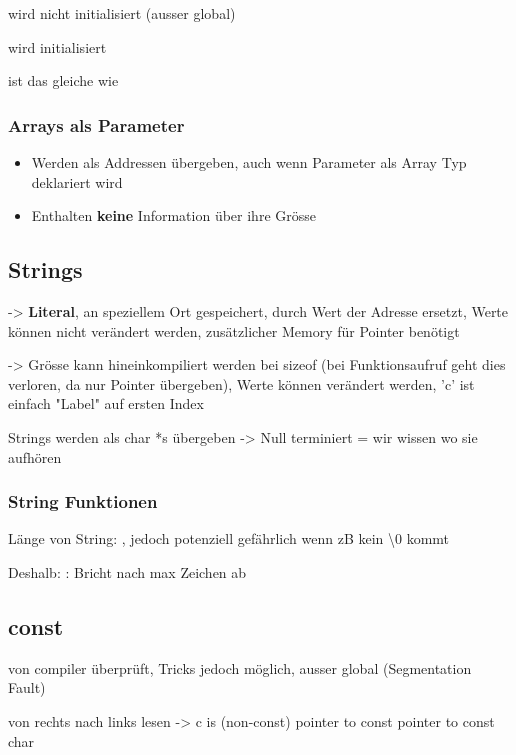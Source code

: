 \begin{multicols*}{4}
 wird nicht initialisiert (ausser global)

 wird initialisiert

 ist das gleiche wie 

\subsubsection{Arrays als Parameter}
\begin{itemize}
    \item Werden als Addressen übergeben, auch wenn Parameter als Array Typ deklariert wird
    \item Enthalten \textbf{keine} Information über ihre Grösse
\end{itemize}

\subsection{Strings}
 -> \textbf{Literal}, an speziellem Ort gespeichert, durch Wert der Adresse ersetzt, Werte können nicht verändert werden, zusätzlicher Memory für Pointer benötigt

 -> Grösse kann hineinkompiliert werden bei sizeof (bei Funktionsaufruf geht dies verloren, da nur Pointer übergeben), Werte können verändert werden, 'c' ist einfach "Label" auf ersten Index

Strings werden als char *s übergeben -> Null terminiert = wir wissen wo sie aufhören

\subsubsection{String Funktionen}
Länge von String: , jedoch potenziell gefährlich wenn zB kein \textbackslash0 kommt

Deshalb: : Bricht nach max Zeichen ab


\subsection{const}
von compiler überprüft, Tricks jedoch möglich, ausser global (Segmentation Fault)\vspace{2pt}

von rechts nach links lesen
 -> c is (non-const) pointer to const pointer to const char


\end{multicols*}
